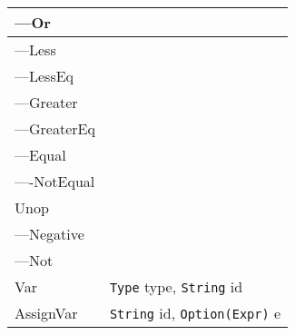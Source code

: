 \documentclass{article}
\begin{document}
\begin{longtable}{p{} | p{}}
    ---Or & \\\hline
    ---Less & \\\hline
    ---LessEq & \\\hline
    ---Greater & \\\hline
    ---GreaterEq & \\\hline
    ---Equal & \\\hline
    ----NotEqual & \\\hline
    Unop & \\\hline
    ---Negative & \\\hline
    ---Not & \\\hline
    Var & \texttt{Type} type, \texttt{String} id \\\hline
    AssignVar & \texttt{String} id, \texttt{Option(Expr)} e \\\hline
\end{longtable}
\end{document}
